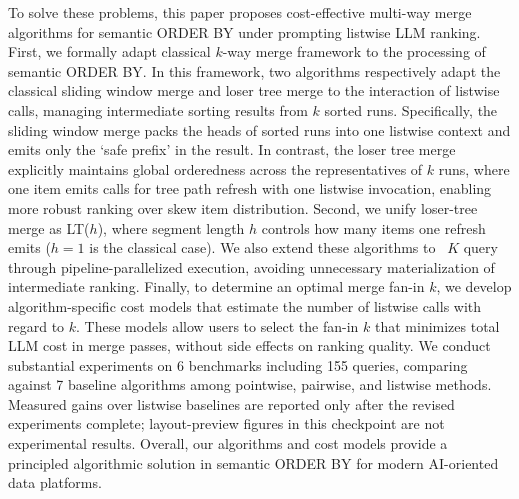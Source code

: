 To solve these problems, this paper proposes cost-effective multi-way merge algorithms for semantic \textsf{ORDER BY} under prompting listwise LLM ranking. First, we formally adapt classical $k$-way merge framework to the processing of semantic \textsf{ORDER BY}. In this framework, two algorithms respectively adapt the classical sliding window merge and loser tree merge to the interaction of listwise calls, managing intermediate sorting results from $k$ sorted runs. 
Specifically, the sliding window merge packs the heads of sorted runs into one listwise context and emits only the `safe prefix' in the result.
In contrast, the loser tree merge explicitly maintains global orderedness across the representatives of $k$ runs, where one item emits calls for tree path refresh with one listwise invocation, enabling more robust ranking over skew item distribution. 
Second, we unify loser-tree merge as LT($h$), where segment length $h$ controls how many items one refresh emits ($h{=}1$ is the classical case). We also extend these algorithms to \LIMIT~$K$ query through pipeline-parallelized execution, avoiding unnecessary materialization of intermediate ranking. 
Finally, to determine an optimal merge fan-in $k$, we develop algorithm-specific cost models that estimate the number of listwise calls with regard to $k$. These models allow users to select the fan-in 
$k$ that minimizes total LLM cost in merge passes, without side effects on ranking quality.
We conduct substantial experiments on 6 benchmarks including 155 queries, comparing against 7 baseline algorithms among pointwise, pairwise, and listwise methods. Measured gains over listwise baselines are reported only after the revised experiments complete; layout-preview figures in this checkpoint are not experimental results. 
Overall, our algorithms and cost models provide a principled algorithmic solution in semantic \textsf{ORDER BY} for modern AI-oriented data platforms.